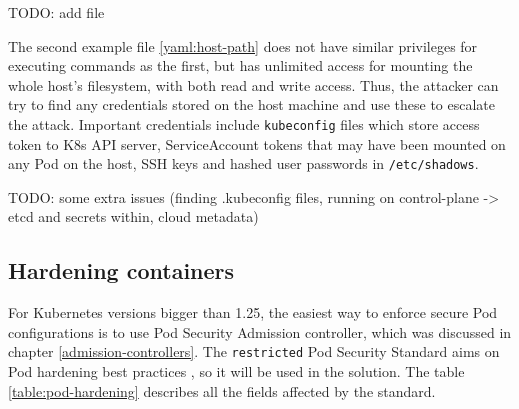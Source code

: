 \documentclass[english, 12pt, a4paper, sci, utf8, a-2b, online]{aaltothesis}
\begin{document}
TODO: add file \label{yaml:host-path}

The second example file \ref{yaml:host-path} does not have similar privileges for executing commands as the first, but has unlimited access for mounting the whole host's filesystem, with both read and write access. Thus, the attacker can try to find any credentials stored on the host machine and use these to escalate the attack. Important credentials include \texttt{kubeconfig} files which store access token to K8s API server, ServiceAccount tokens that may have been mounted on any Pod on the host, SSH keys and hashed user passwords in \texttt{/etc/shadows}.

TODO: some extra issues (finding .kubeconfig files, running on control-plane -> etcd and secrets within, cloud metadata)

\subsection{Hardening containers}

For Kubernetes versions bigger than 1.25, the easiest way to enforce secure Pod configurations is to use Pod Security Admission controller, which was discussed in chapter \ref{admission-controllers}. The \texttt{restricted} Pod Security Standard aims on Pod hardening best practices \cite{k8s-docs-pss}, so it will be used in the solution. The table \ref{table:pod-hardening} describes all the fields affected by the standard.
\end{document}
